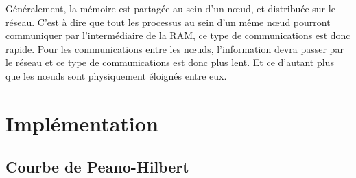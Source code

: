 %
%
%
%
%

Généralement, la mémoire est partagée au sein d'un nœud, et distribuée sur le réseau.
C'est à dire que tout les processus au sein d'un même nœud pourront communiquer par l'intermédiaire de la RAM, ce type de communications est donc rapide.
Pour les communications entre les nœuds, l'information devra passer par le réseau et ce type de communications est donc plus lent.
Et ce d'autant plus que les nœuds sont physiquement éloignés entre eux.

\section{Implémentation}

\subsection{Courbe de Peano-Hilbert}
\label{sec:parasoft}


